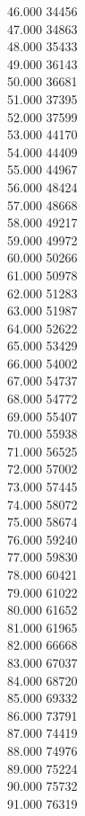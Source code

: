 { 46.000	34456 \\
 47.000	34863 \\
 48.000	35433 \\
 49.000	36143 \\
 50.000	36681 \\
 51.000	37395 \\
 52.000	37599 \\
 53.000	44170 \\
 54.000	44409 \\
 55.000	44967 \\
 56.000	48424 \\
 57.000	48668 \\
 58.000	49217 \\
 59.000	49972 \\
 60.000	50266 \\
 61.000	50978 \\
 62.000	51283 \\
 63.000	51987 \\
 64.000	52622 \\
 65.000	53429 \\
 66.000	54002 \\
 67.000	54737 \\
 68.000	54772 \\
 69.000	55407 \\
 70.000	55938 \\
 71.000	56525 \\
 72.000	57002 \\
 73.000	57445 \\
 74.000	58072 \\
 75.000	58674 \\
 76.000	59240 \\
 77.000	59830 \\
 78.000	60421 \\
 79.000	61022 \\
 80.000	61652 \\
 81.000	61965 \\
 82.000	66668 \\
 83.000	67037 \\
 84.000	68720 \\
 85.000	69332 \\
 86.000	73791 \\
 87.000	74419 \\
 88.000	74976 \\
 89.000	75224 \\
 90.000	75732 \\
 91.000	76319 \\
}

